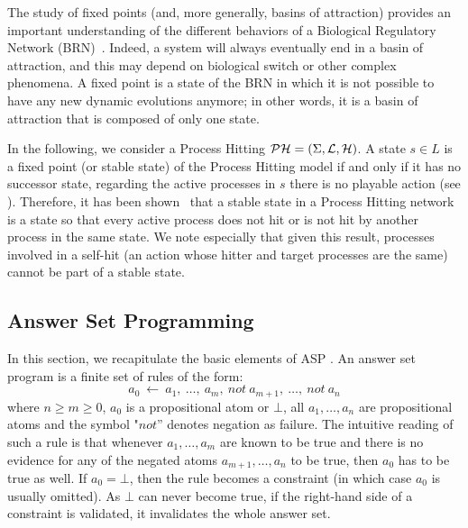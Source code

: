 The study of fixed points (and, more generally, basins of attraction) provides an important understanding of the different behaviors of a Biological Regulatory Network (BRN)~\cite{wuensche1998genomic}.
Indeed, a system will always eventually end in a basin of attraction,
and this may depend on biological switch or other complex phenomena.
A fixed point is a state of the BRN in which it is not possible to have any new dynamic evolutions anymore;
in other words, it is a basin of attraction that is composed of only one state.

In the following, we consider a Process Hitting $\mathcal{PH} = (\Sigma, \mathcal{L}, \mathcal{H})$.
A state $s \in L$ is a fixed point (or stable state) of the Process Hitting model if and only if it has no successor state, \ie regarding the active processes in $s$ there is no playable action (see ).
Therefore, it has been shown~\cite{PMR10-TCSB} that
a stable state in a Process Hitting network is a state so that
every active process does not hit or is not hit by another process in the same state.
We note especially that given this result, processes involved in a self-hit (an action whose hitter and target processes are the same) cannot be part of a stable state.

\subsection{Answer Set Programming}

In this section, we recapitulate the basic elements of ASP \cite{baral2003knowledge, Vladimir, Glimpse}.
An answer set program is a finite set of rules of the form:
  \[a_{0}\ \leftarrow \ a_{1},\ \ldots,\ a_{m},\ not\ a_{m+1},\ \ldots,\ not\ a_{n}\]
where $n \ge m \ge 0$, $a_{0}$ is a propositional atom or $\bot$, all
$a_{1}, \ldots ,a_{n}$ are propositional atoms and the symbol "$not$'' denotes  negation as failure.
The intuitive reading of such a rule is that whenever $a_{1}, \ldots, a_{m}$
are known to be true and there is no evidence for any of the negated atoms $a_{m+1}, \ldots, a_{n}$ to be true, then $a_{0}$ has to be true as well.
If $a_{0} = \bot$, then the rule becomes a constraint (in which case $a_{0}$ is usually omitted).
As $\bot$ can never become true, if the right-hand side of a constraint is validated, it invalidates the whole answer set.

